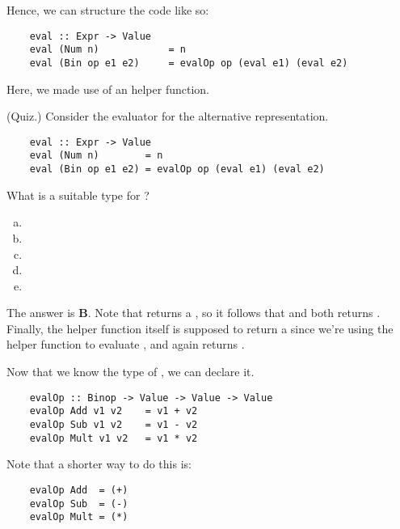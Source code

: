 \documentclass[letterpaper]{article}
\begin{document}
Hence, we can structure the  code like so: 
\begin{verbatim}
    eval :: Expr -> Value
    eval (Num n)            = n 
    eval (Bin op e1 e2)     = evalOp op (eval e1) (eval e2)\end{verbatim}
Here, we made use of an  helper function.

\begin{mdframed}[]
    (Quiz.) Consider the evaluator for the alternative representation.
    \begin{verbatim}
    eval :: Expr -> Value
    eval (Num n)        = n
    eval (Bin op e1 e2) = evalOp op (eval e1) (eval e2)\end{verbatim} 

    What is a suitable type for ? 
    \begin{enumerate}[(a)]
        \item {}
        \item {}
        \item {}
        \item {}
        \item {}
    \end{enumerate}

    \begin{mdframed}[]
        The answer is \textbf{B}. Note that  returns a , so it follows that  and  both returns . Finally, the helper function itself is supposed to return a  since we're using the helper function to evaluate , and  again returns .
    \end{mdframed}
\end{mdframed}

Now that we know the type of , we can declare it. 
\begin{verbatim}
    evalOp :: Binop -> Value -> Value -> Value 
    evalOp Add v1 v2    = v1 + v2 
    evalOp Sub v1 v2    = v1 - v2 
    evalOp Mult v1 v2   = v1 * v2 \end{verbatim}
Note that a shorter way to do this is: 
\begin{verbatim}
    evalOp Add  = (+)
    evalOp Sub  = (-)
    evalOp Mult = (*)\end{verbatim}
\end{document}

